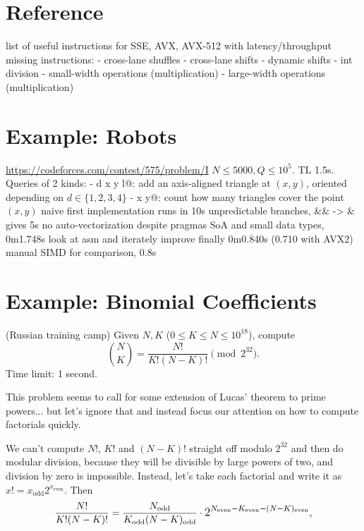 \documentclass[openany]{book}
\begin{document}
\chapter{Reference}
list of useful instructions for SSE, AVX, AVX-512 with latency/throughput
missing instructions:
- cross-lane shuffles
- cross-lane shifts
- dynamic shifts
- int division
- small-width operations (multiplication)
- large-width operations (multiplication)

\chapter{Example: Robots}
\url{https://codeforces.com/contest/575/problem/I}
$N \le 5000, Q \le 10^5$. TL 1.5s. Queries of 2 kinds:
-  d x y l@: add an axis-aligned triangle at $(x,y)$, oriented depending on $d \in \{1,2,3,4\}$
-  x y@: count how many triangles cover the point $(x, y)$
naive first implementation runs in 10s
unpredictable branches, \&\& -> \& gives 5s
no auto-vectorization despite pragmas
SoA and small data types, 0m1.748s
look at asm and iterately improve
finally 0m0.840s (0.710 with AVX2)
manual SIMD for comparison, 0.8s

\chapter{Example: Binomial Coefficients}
\begin{framed}
\noindent
(Russian training camp) Given $N, K$ ($0 \le K \le N \le 10^{18}$), compute
\[
\binom N K = \frac{N!}{K!(N-K)!} \pmod {2^{32}}.
\]
Time limit: 1 second.
\end{framed}
This problem seems to call for some extension of Lucas' theorem to prime powers... but let's ignore that and instead focus our attention on how to compute factorials quickly.

\newcommand{\odd}[1]{#1_\text{odd}}
\newcommand{\even}[1]{#1_\text{even}}

We can't compute $N!$, $K!$ and $(N-K)!$ straight off modulo $2^{32}$ and then do modular division, because they will be divisible by large powers of two, and division by zero is impossible. Instead, let's take each factorial and write it as $x! = \odd{x}2^{\even{x}}$. Then
\[
\frac{N!}{K!(N-K)!} =
\frac{\odd N}{\odd K \odd{(N-K)}} \cdot \mathlarger{2^{\even N - \even K - \even{(N-K)}}},
\]
\end{document}
